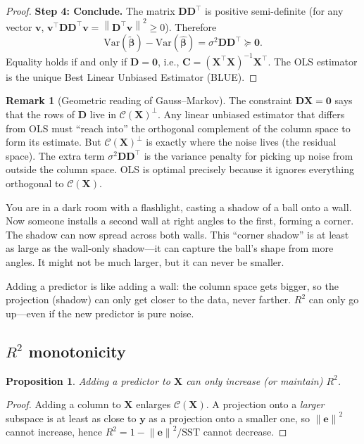 \documentclass[11pt,a4paper]{article}
\theoremstyle{plain}
\newtheorem{proposition}[theorem]{Proposition}
\theoremstyle{definition}
\newtheorem{remark}[theorem]{Remark}
\newcommand{\bhat}{\hat{\bm{\beta}}}
\newcommand{\btilde}{\tilde{\bm{\beta}}}
\newcommand{\bX}{\bm{X}}
\newcommand{\by}{\bm{y}}
\newcommand{\be}{\bm{e}}
\newcommand{\bD}{\bm{D}}
\newcommand{\Col}{\mathcal{C}}
\newcommand{\norm}[1]{\left\lVert #1 \right\rVert}
\begin{document}
\begin{proof}
\medskip
\noindent\textbf{Step 4: Conclude.}
The matrix $\bD\bD^\top$ is positive semi-definite (for any vector $\bm{v}$,
$\bm{v}^\top\bD\bD^\top\bm{v} = \norm{\bD^\top\bm{v}}^2 \ge 0$).
Therefore
\[
  \boxed{
  \text{Var}(\btilde) - \text{Var}(\bhat)
  = \sigma^2\bD\bD^\top \succeq \bm{0}.
  }
\]
Equality holds if and only if $\bD = \bm{0}$, i.e., $\bm{C} = (\bX^\top\bX)^{-1}\bX^\top$.
The OLS estimator is the unique Best Linear Unbiased Estimator (BLUE).
\end{proof}

\begin{remark}[Geometric reading of Gauss--Markov]
The constraint $\bD\bX = \bm{0}$ says that the rows of $\bD$ live in
$\Col(\bX)^\perp$.  Any linear unbiased estimator that differs from OLS
must ``reach into'' the orthogonal complement of the column space to
form its estimate.  But $\Col(\bX)^\perp$ is exactly where the noise lives
(the residual space).  The extra term $\sigma^2\bD\bD^\top$ is the
variance penalty for picking up noise from outside the column space.
OLS is optimal precisely because it ignores everything orthogonal to
$\Col(\bX)$.
\end{remark}

\begin{toystory}
You are in a dark room with a flashlight, casting a shadow of a ball
onto a wall.  Now someone installs a second wall at right angles to the
first, forming a corner.  The shadow can now spread across both walls.
This ``corner shadow'' is at least as large as the wall-only shadow---it
can capture the ball's shape from more angles.  It might not be much
larger, but it can never be smaller.

Adding a predictor is like adding a wall: the column space gets bigger,
so the projection (shadow) can only get closer to the data, never
farther.  $R^2$ can only go up---even if the new predictor is pure noise.
\end{toystory}

\subsection{$R^2$ monotonicity}

\begin{proposition}\label{prop:r2mono}
Adding a predictor to $\bX$ can only increase (or maintain) $R^2$.
\end{proposition}

\begin{proof}
Adding a column to $\bX$ enlarges $\Col(\bX)$.
A projection onto a \emph{larger} subspace is at least as close to
$\by$ as a projection onto a smaller one, so $\norm{\be}^2$ cannot
increase, hence $R^2 = 1 - \norm{\be}^2/\text{SST}$ cannot decrease.
\end{proof}
\end{document}
